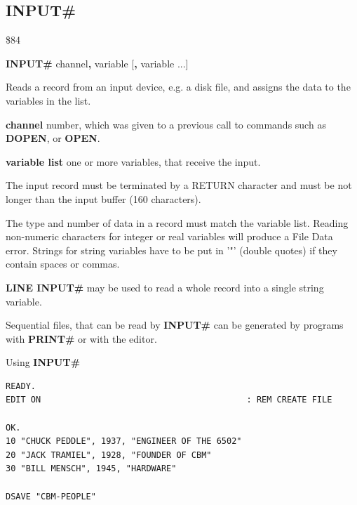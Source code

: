 
\newpage
\subsection{INPUT\#}
\begin{description}[leftmargin=2cm,style=nextline]
\item [Token:]    \$84

\item [Format:]   {\bf INPUT\#} channel{\bf,} variable [{\bf,} variable ...]

\item [Usage:]    Reads a record from an input device, e.g. a disk file, and assigns the data to the variables in the list.

                  {\bf channel} number, which was given to a previous call to commands such as {\bf DOPEN}, or {\bf OPEN}.

                  {\bf variable list} one or more variables, that receive the input.

                  The input record must be terminated by a RETURN character and must be not longer than the input buffer (160 characters).

\item [Remarks:]  The type and number of data in a record must match the variable list. Reading non-numeric characters for integer or real variables will produce a File Data error. Strings for string variables have to be put in '"' (double quotes) if they contain spaces or commas.

                  {\bf LINE INPUT\#} may be used to read a whole record into a single string variable.

                  Sequential files, that can be read by {\bf INPUT\#} can be generated by programs with {\bf PRINT\#} or with the editor.

\item [Example:]  Using {\bf INPUT\#}

\begin{tcolorbox}[colback=black,coltext=white]
\verbatimfont{\codefont}
\begin{verbatim}
READY.
EDIT ON                                         : REM CREATE FILE

OK.
10 "CHUCK PEDDLE", 1937, "ENGINEER OF THE 6502"
20 "JACK TRAMIEL", 1928, "FOUNDER OF CBM"
30 "BILL MENSCH", 1945, "HARDWARE"

DSAVE "CBM-PEOPLE"


\end{verbatim}
\end{tcolorbox}
\end{description}
